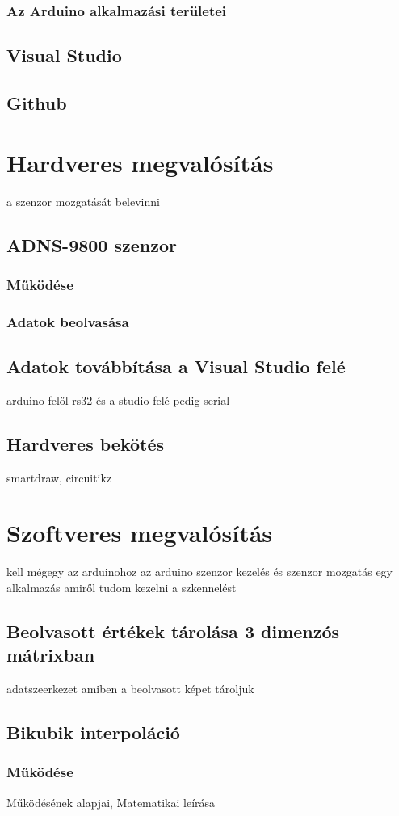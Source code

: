 \documentclass[]{thesis-ekf}
\theoremstyle{definition}
\theoremstyle{remark}
\begin{document}
\subsection{Az Arduino alkalmazási területei}
\section{Visual Studio}
\section{Github}
\chapter{Hardveres megvalósítás}
a szenzor mozgatását belevinni
\section{ADNS-9800 szenzor}
\subsection{Működése}
\subsection{Adatok beolvasása}
\section{Adatok továbbítása a Visual Studio felé}
arduino felől rs32 és a studio felé pedig serial
\section{Hardveres bekötés}
smartdraw, circuitikz
\chapter{Szoftveres megvalósítás}
kell mégegy az arduinohoz az arduino szenzor kezelés és szenzor mozgatás
egy alkalmazás amiről tudom kezelni a szkennelést
\section{Beolvasott értékek tárolása 3 dimenzós mátrixban}
adatszeerkezet amiben a beolvasott képet tároljuk
\section{Bikubik interpoláció}
\subsection{Működése}
Működésének alapjai, Matematikai leírása
\end{document}
